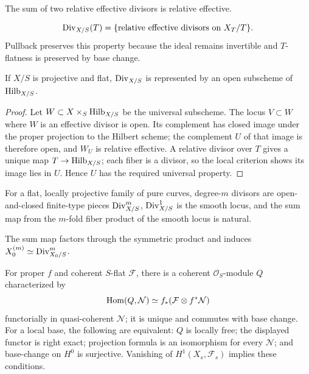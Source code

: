 \begin{remark}[Sums]\label{kps-ex-sums}
The sum of two relative effective divisors is relative effective.
\end{remark}

\begin{definition}\label{kps-def-divisor-functor}
\[\operatorname{Div}_{X/S}(T)=\{\text{relative effective divisors on }X_T/T\}.\]
Pullback preserves this property because the ideal remains invertible and
$T$-flatness is preserved by base change.
\end{definition}

\begin{theorem}\label{kps-thm-divisor-representability}
If $X/S$ is projective and flat, $\operatorname{Div}_{X/S}$ is represented by an open
subscheme of $\operatorname{Hilb}_{X/S}$.
\end{theorem}
\begin{proof}
Let $W\subset X\times_S\operatorname{Hilb}_{X/S}$ be the universal subscheme. The locus
$V\subset W$ where $W$ is an effective divisor is open. Its complement has
closed image under the proper projection to the Hilbert scheme; the complement
$U$ of that image is therefore open, and $W_U$ is relative effective. A
relative divisor over $T$ gives a unique map $T\to\operatorname{Hilb}_{X/S}$; each fiber is
a divisor, so the local criterion shows its image lies in $U$. Hence $U$ has
the required universal property.
\end{proof}

\begin{remark}\label{kps-ex-curve-divisors}
For a flat, locally projective family of pure curves, degree-$m$ divisors are
open-and-closed finite-type pieces $\operatorname{Div}^m_{X/S}$, $\operatorname{Div}^1_{X/S}$ is the
smooth locus, and the sum map from the $m$-fold fiber product of the smooth
locus is natural.\end{remark}
\begin{remark}\label{kps-rmk-symmetric-product}
The sum map factors through the symmetric product and induces
$X_0^{(m)}\simeq\operatorname{Div}^m_{X_0/S}$.
\end{remark}

\begin{definition}\label{kps-def-Q}
For proper $f$ and coherent $S$-flat $\mathcal F$, there is a coherent
$\mathcal O_S$-module $Q$ characterized by
\[\operatorname{Hom}(Q,\mathcal N)\simeq f_*(\mathcal F\otimes f^*\mathcal N)\]
functorially in quasi-coherent $\mathcal N$; it is unique and commutes with
base change. For a local base, the following are equivalent: $Q$ is locally
free; the displayed functor is right exact; projection formula is an
isomorphism for every $\mathcal N$; and base-change on $H^0$ is surjective.
Vanishing of $H^1(X_s,\mathcal F_s)$ implies these conditions.
\end{definition}

